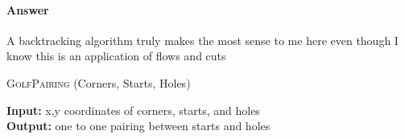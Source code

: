 \documentclass{article}
\begin{document}
\paragraph{Answer}

A backtracking algorithm truly makes the most sense to me here even though I know this
is an application of flows and cuts

\begin{algorithm} \caption{\textsc{GolfPairing} (Corners, Starts, Holes)}\label{alg:seb}
    {\bf Input:} x,y coordinates of corners, starts, and holes\\
    {\bf Output:} one to one pairing between starts and holes
    \begin{algorithmic}[1]
        \State$$
    \end{algorithmic}
\end{algorithm}

\end{document}
